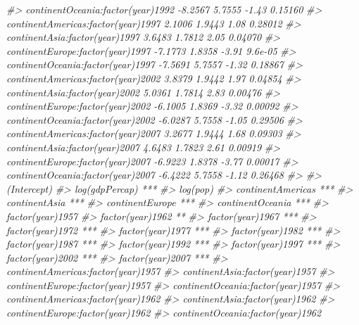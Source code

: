 \documentclass[]{book}
\newenvironment{Shaded}{\begin{snugshade}}{\end{snugshade}}
\newcommand{\CommentTok}[1]{\textcolor[rgb]{0.56,0.35,0.01}{\textit{#1}}}
\begin{document}
\begin{Shaded}
\begin{Highlighting}[]
\CommentTok{#> continentOceania:factor(year)1992   -8.2567     5.7555   -1.43  0.15160}
\CommentTok{#> continentAmericas:factor(year)1997   2.1006     1.9443    1.08  0.28012}
\CommentTok{#> continentAsia:factor(year)1997       3.6483     1.7812    2.05  0.04070}
\CommentTok{#> continentEurope:factor(year)1997    -7.1773     1.8358   -3.91  9.6e-05}
\CommentTok{#> continentOceania:factor(year)1997   -7.5691     5.7557   -1.32  0.18867}
\CommentTok{#> continentAmericas:factor(year)2002   3.8379     1.9442    1.97  0.04854}
\CommentTok{#> continentAsia:factor(year)2002       5.0361     1.7814    2.83  0.00476}
\CommentTok{#> continentEurope:factor(year)2002    -6.1005     1.8369   -3.32  0.00092}
\CommentTok{#> continentOceania:factor(year)2002   -6.0287     5.7558   -1.05  0.29506}
\CommentTok{#> continentAmericas:factor(year)2007   3.2677     1.9444    1.68  0.09303}
\CommentTok{#> continentAsia:factor(year)2007       4.6483     1.7823    2.61  0.00919}
\CommentTok{#> continentEurope:factor(year)2007    -6.9223     1.8378   -3.77  0.00017}
\CommentTok{#> continentOceania:factor(year)2007   -6.4222     5.7558   -1.12  0.26468}
\CommentTok{#>                                       }
\CommentTok{#> (Intercept)                           }
\CommentTok{#> log(gdpPercap)                     ***}
\CommentTok{#> log(pop)                              }
\CommentTok{#> continentAmericas                  ***}
\CommentTok{#> continentAsia                      ***}
\CommentTok{#> continentEurope                    ***}
\CommentTok{#> continentOceania                   ***}
\CommentTok{#> factor(year)1957                      }
\CommentTok{#> factor(year)1962                   ** }
\CommentTok{#> factor(year)1967                   ***}
\CommentTok{#> factor(year)1972                   ***}
\CommentTok{#> factor(year)1977                   ***}
\CommentTok{#> factor(year)1982                   ***}
\CommentTok{#> factor(year)1987                   ***}
\CommentTok{#> factor(year)1992                   ***}
\CommentTok{#> factor(year)1997                   ***}
\CommentTok{#> factor(year)2002                   ***}
\CommentTok{#> factor(year)2007                   ***}
\CommentTok{#> continentAmericas:factor(year)1957    }
\CommentTok{#> continentAsia:factor(year)1957        }
\CommentTok{#> continentEurope:factor(year)1957      }
\CommentTok{#> continentOceania:factor(year)1957     }
\CommentTok{#> continentAmericas:factor(year)1962    }
\CommentTok{#> continentAsia:factor(year)1962        }
\CommentTok{#> continentEurope:factor(year)1962      }
\CommentTok{#> continentOceania:factor(year)1962     }

\end{Highlighting}
\end{Shaded}
\end{document}
